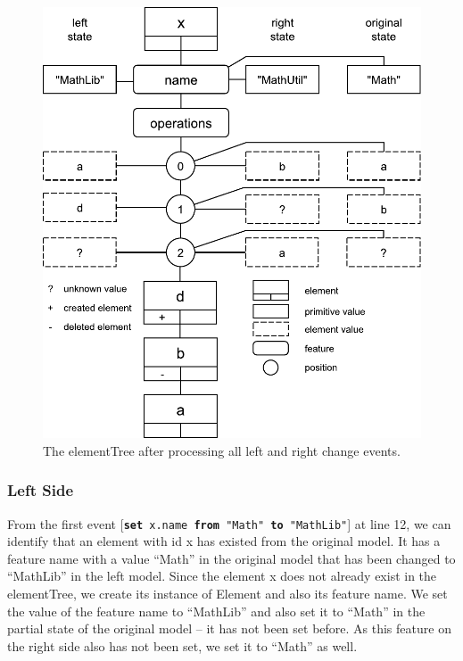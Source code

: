 \begin{figure}
    \includegraphics[width=\linewidth]{RightElementTreeDiagram}
    \caption{The \textsf{elementTree} after processing all left and right change events.}
    \label{fig:right_element_tree_diagram}
\end{figure}

\subsubsection{Left Side}\label{sec:left_side}

From the first event [\texttt{\small \textbf{set} x.name \textbf{from} "Math" \textbf{to} "MathLib"}] at line 12, we can identify that an element with id \textsf{x} has existed from the original model. 
It has a feature \textsf{name} with a value ``Math'' in the original model that has been changed to ``MathLib'' in the left model. Since the element \textsf{x} does not already exist in the \textsf{elementTree}, we create its instance of \textsf{Element} and also its feature \textsf{name}. We set the value of the feature \textsf{name} to ``MathLib'' and also set it to ``Math'' in the partial state of the original model -- it has not been set before. As this feature on the right side also has not been set, we set it to ``Math'' as well. 

